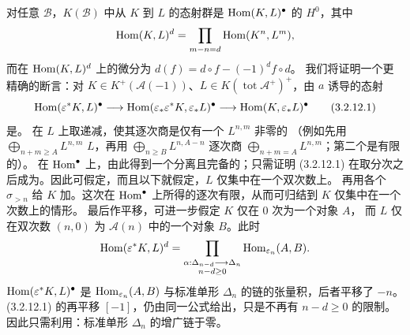 对任意 $\mathcal B$，$K(\mathcal B)$ 中从 $K$ 到 $L$ 的态射群是
$\operatorname{Hom}(K,L)^\bullet$ 的 $H^0$，其中
\[
\operatorname{Hom}(K,L)^d=\prod_{m-n=d}\operatorname{Hom}(K^n,L^m),
\]
而在 $\operatorname{Hom}(K,L)^d$ 上的微分为
$d(f)=d\circ f-(-1)^df\circ d$。
我们将证明一个更精确的断言：对
$K\in K^+(\mathcal A(-1))$、$L\in K(\operatorname{tot}\mathcal A^+)^+$，由 $a$ 诱导的态射
\begin{equation*}
\operatorname{Hom}(\varepsilon^*K,L)^\bullet
 \longrightarrow\operatorname{Hom}(\varepsilon_*\varepsilon^*K,\varepsilon_*L)^\bullet
 \longrightarrow\operatorname{Hom}(K,\varepsilon_*L)^\bullet
\tag{3.2.12.1}
\end{equation*}
是。
在 $L$ 上取递减，使其逐次商是仅有一个 $L^{n,m}$ 非零的
（例如先用 $\bigoplus_{n+m\geq A}L^{n,m}$  $L$，再用
$\bigoplus_{n\geq B}L^{n,A-n}$ 逐次商
$\bigoplus_{n+m=A}L^{n,m}$；第二个是有限的）。
在 $\operatorname{Hom}^\bullet$ 上，由此得到一个分离且完备的；只需证明
(3.2.12.1) 在取分次之后成为。因此可假定，而且以下就假定，$L$ 仅集中在一个双次数上。
再用各个 $\sigma_{>n}$ 给 $K$ 加。这次在 $\operatorname{Hom}^\bullet$ 上所得的逐次有限，从而可归结到 $K$ 仅集中在一个次数上的情形。
最后作平移，可进一步假定 $K$ 仅在 $0$ 次为一个对象 $A$，
而 $L$ 仅在双次数 $(n,0)$ 为 $\mathcal A(n)$ 中的一个对象 $B$。此时
\[
\operatorname{Hom}(\varepsilon^*K,L)^d=
\prod_{\substack{\alpha:\Delta_{n-d}\longrightarrow\Delta_n\\n-d\geq0}}
\operatorname{Hom}_{\varepsilon_n}(A,B).
\]
 $\operatorname{Hom}(\varepsilon^*K,L)^\bullet$ 是
$\operatorname{Hom}_{\varepsilon_n}(A,B)$ 与标准单形 $\Delta_n$ 的链的张量积，后者平移了 $-n$。
(3.2.12.1) 的再平移 $[-1]$，仍由同一公式给出，只是不再有
$n-d\geq0$ 的限制。因此只需利用：标准单形 $\Delta_n$ 的增广链于零。

